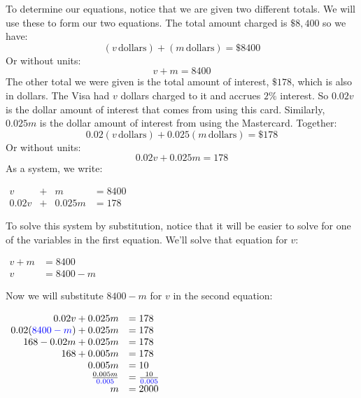 \documentclass[nooutcomes]{ximera}
\begin{document}
\begin{example}
\begin{explanation}
          To determine our equations, notice that we are given two different totals.
          We will use these to form our two equations.
          The total amount charged is $\$8{,}400$ so we have:
        $$ 
            (v\,\text{dollars})+(m\,\text{dollars})=\$8400
          $$
          Or without units:
          $$
            v+m=8400 
     $$
          The other total we were given is the total amount of interest,
          $\$178$, which is also in dollars.
          The Visa had $v$ dollars charged to it and accrues $2\%$ interest.
          So $0.02v$ is the dollar amount of interest that comes from using this card.
          Similarly, $0.025m$ is the dollar amount of interest from using the Mastercard.
          Together:
      $$
            0.02(v\,\text{dollars})+0.025(m\,\text{dollars})=\$178
         $$
          Or without units:
       $$
            0.02v+0.025m=178
  $$
          As a system, we write:
   \begin{center}
         $ 
            \begin{array}{cccc}
            v&+& m&=8400 \\
            0.02v&+& 0.025m&=178 
            \end{array}
$
\end{center}
          To solve this system by substitution,
          notice that it will be easier to solve for one of the variables in the first equation.
          We'll solve that equation for $v$:
\begin{center}
$
\begin{array}{rl}
            v+m&=8400\\
            v&=8400-m
\end{array}
$
\end{center}
          Now we will substitute $8400-m$ for $v$ in the second equation:
\begin{center}
$
          \begin{array}{rl}
            0.02v+0.025m&=178\\
            0.02({\color{blue}{{8400-m}}})+0.025m&=178\\
            168-0.02m+0.025m&=178\\
            168+0.005m&=178\\
            0.005m&=10\\
            \frac{0.005m}{{\color{blue}{{0.005}}}}&=\frac{10}{{\color{blue}{{0.005}}}}\\
            m&=2000
      \end{array}
$
\end{center}

\end{explanation}
\end{example}
\end{document}
